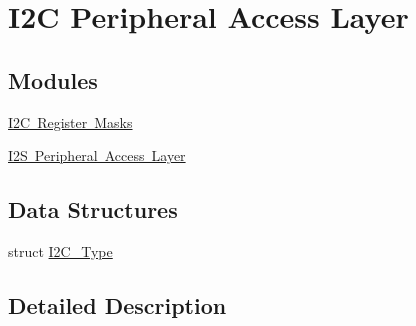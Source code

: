 \hypertarget{group___i2_c___peripheral___access___layer}{}\section{I2C Peripheral Access Layer}
\label{group___i2_c___peripheral___access___layer}
\subsection*{Modules}
\begin{DoxyCompactItemize}
\item 
\mbox{\hyperlink{group___i2_c___register___masks}{I2\+C Register Masks}}
\item 
\mbox{\hyperlink{group___i2_s___peripheral___access___layer}{I2\+S Peripheral Access Layer}}
\end{DoxyCompactItemize}
\subsection*{Data Structures}
\begin{DoxyCompactItemize}
\item 
struct \mbox{\hyperlink{struct_i2_c___type}{I2\+C\+\_\+\+Type}}
\end{DoxyCompactItemize}


\subsection{Detailed Description}
